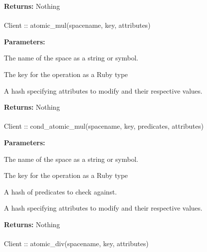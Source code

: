 \noindent\textbf{Returns:}
Nothing

\paragraph{}
\begin{ccode}
Client :: atomic_mul(spacename, key, attributes)
\end{ccode}
\funcdesc 

\noindent\textbf{Parameters:}
\begin{description}[labelindent=\widthof{{attributes}},leftmargin=*,noitemsep,nolistsep,align=right]
\item[spacename] The name of the space as a string or symbol.
\item[key] The key for the operation as a Ruby type
\item[attributes] A hash specifying attributes to modify and their respective values.
\end{description}

\noindent\textbf{Returns:}
Nothing

\paragraph{}
\begin{ccode}
Client :: cond_atomic_mul(spacename, key, predicates, attributes)
\end{ccode}
\funcdesc 

\noindent\textbf{Parameters:}
\begin{description}[labelindent=\widthof{{predicates}},leftmargin=*,noitemsep,nolistsep,align=right]
\item[spacename] The name of the space as a string or symbol.
\item[key] The key for the operation as a Ruby type
\item[predicates] A hash of predicates to check against.
\item[attributes] A hash specifying attributes to modify and their respective values.
\end{description}

\noindent\textbf{Returns:}
Nothing

\paragraph{}
\begin{ccode}
Client :: atomic_div(spacename, key, attributes)
\end{ccode}
\funcdesc 

